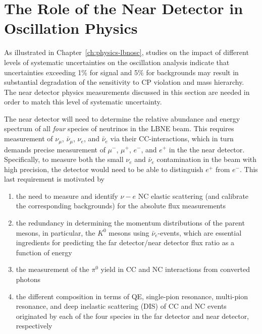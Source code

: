 \section{The Role of the Near Detector in Oscillation Physics} 
\label{sec-nd-oscl} 

As illustrated in Chapter~\ref{ch:physics-lbnosc}, studies on the impact of different levels of systematic 
uncertainties on the oscillation analysis indicate 
that uncertainties exceeding 1\% for signal and 5\% for backgrounds may result in 
substantial degradation of the sensitivity to CP violation and mass hierarchy. 
The near detector physics measurements discussed in this section are needed in order to match this level of systematic uncertainty.   

The near detector will need to determine the relative abundance and 
energy spectrum of all \textit{four} species of neutrinos in the LBNE beam.
%
This requires measurement of 
$\nu_\mu$, $\bar \nu_\mu$, $\nu_e$, and $\bar \nu_e$ via their  CC-interactions,  
which in turn demands precise measurement of $\mu^-$, $\mu^+$, $e^-$, and $e^+$ in the 
the near detector. Specifically, to measure both the small $\nu_e$ and $\bar \nu_e$ contamination in the beam with high precision, 
the detector would need to be able to distinguish $e^+$  from $e^-$. 
This last requirement is motivated by 
\begin{enumerate}
\item the need to measure and identify $\nu - e$ NC elastic scattering (and calibrate 
the corresponding backgrounds) for the absolute flux measurements
\item  the redundancy in determining the momentum distributions 
of the parent mesons, in particular, the $K^0$ mesons using $\bar \nu_e$-events, 
which are essential ingredients for predicting the far detector/near detector flux ratio as a function of energy
\item the measurement of the $\pi^0$ yield in CC and NC interactions 
from converted photons
\item the different composition in terms of QE, single-pion resonance, multi-pion resonance, and deep inelastic scattering (DIS) of CC and NC events originated by each of the four species in the far detector and near detector, respectively 
\end{enumerate}


